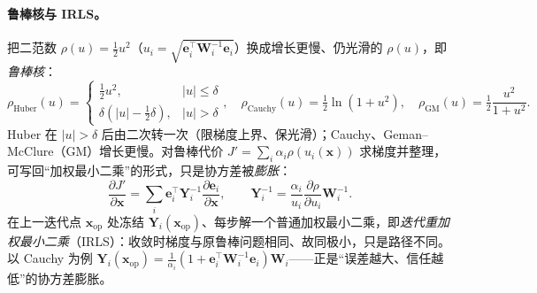 \paragraph{鲁棒核与 IRLS。}
把二范数 $\rho(u)=\tfrac12u^2$（$u_i=\sqrt{\mathbf{e}_i^\top\mathbf{W}_i^{-1}\mathbf{e}_i}$）换成增长更慢、仍光滑的 $\rho(u)$，即\emph{鲁棒核}\cite{gaoxiang2019slam14,barfoot2024state}：
\begin{equation}
  \rho_{\text{Huber}}(u)=\begin{cases}\tfrac12u^2,&|u|\le\delta\\ \delta(|u|-\tfrac12\delta),&|u|>\delta\end{cases},\quad
  \rho_{\text{Cauchy}}(u)=\tfrac12\ln(1+u^2),\quad
  \rho_{\text{GM}}(u)=\tfrac12\frac{u^2}{1+u^2}.
  \label{eq:robust-kernels}
\end{equation}
Huber 在 $|u|>\delta$ 后由二次转一次（限梯度上界、保光滑）；Cauchy、Geman–McClure（GM）增长更慢。对鲁棒代价 $J'=\sum_i\alpha_i\rho(u_i(\mathbf{x}))$ 求梯度并整理，可写回“加权最小二乘”的形式，只是协方差被\emph{膨胀}：
\begin{equation}
  \frac{\partial J'}{\partial\mathbf{x}}=\sum_i\mathbf{e}_i^\top\mathbf{Y}_i^{-1}\frac{\partial\mathbf{e}_i}{\partial\mathbf{x}},\qquad
  \mathbf{Y}_i^{-1}=\frac{\alpha_i}{u_i}\frac{\partial\rho}{\partial u_i}\mathbf{W}_i^{-1}.
  \label{eq:irls-weight}
\end{equation}
在上一迭代点 $\mathbf{x}_{\text{op}}$ 处冻结 $\mathbf{Y}_i(\mathbf{x}_{\text{op}})$、每步解一个普通加权最小二乘，即\emph{迭代重加权最小二乘}（IRLS）：收敛时梯度与原鲁棒问题相同、故同极小，只是路径不同。以 Cauchy 为例 $\mathbf{Y}_i(\mathbf{x}_{\text{op}})=\tfrac1{\alpha_i}(1+\mathbf{e}_i^\top\mathbf{W}_i^{-1}\mathbf{e}_i)\mathbf{W}_i$——正是“误差越大、信任越低”的协方差膨胀。

